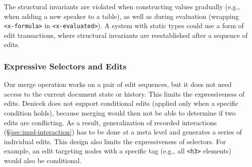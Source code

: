 \documentclass[sigconf]{acmart}
\newcommand{\ident}[1]{{\sffamily #1}}
\begin{document}
The structural invariants are violated when constructing values gradually (e.g., when adding a new
speaker to a table), as well as during evaluation (wrapping {\small\texttt{<x-formula>}}
in {\small\texttt{<x-evaluated>}}). A system with static types could use a form of edit
transactions, where structural invariants are reestablished after a sequence of edits.

%


\subsubsection*{Expressive Selectors and Edits}
Our merge operation works on a pair of edit sequences, but it does not need access
to the current document state or history. This limits the expressiveness of edits. Denicek does not
support conditional edits (applied only when a specific condition holds), because merging would then
not be able to determine if two edits are conflicting. As a result, generalization of recorded
interactions (\S\ref{sec:impl-interaction}) has to be done at a meta level and generates a series
of individual edits. This design also limits the expressiveness of selectors. For example,
an edit targeting nodes with a specific tag (e.g., all {\small\texttt{<h3>}} elements) would also be
conditional.
\end{document}
